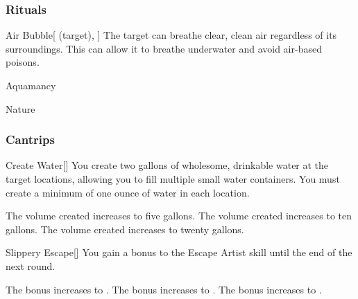 \subsubsection{Rituals}


\lowercase{\hypertarget{spell:Air Bubble}{}}\label{spell:Air Bubble}
\begin{attuneability}[Rank 3]{\hypertarget{spell:Air Bubble}{Air Bubble}}[ (target), ]
The target can breathe clear, clean air regardless of its surroundings.
This can allow it to breathe underwater and avoid air-based poisons.
\end{attuneability}
\vspace{0.25em}


\newpage
\begin{spellsection}{Aquamancy}

\begin{spellheader}
\end{spellheader}


 Nature

\subsubsection{Cantrips}


\begin{freeability}{Create Water}[]
You create two gallons of wholesome, drinkable water at the target locations, allowing you to fill multiple small water containers.
You must create a minimum of one ounce of water in each location.

\rankline
{} The volume created increases to five gallons.
 The volume created increases to ten gallons.
 The volume created increases to twenty gallons.
\end{freeability}


\begin{freeability}{Slippery Escape}[]
You gain a  bonus to the Escape Artist skill until the end of the next round.

\rankline
{} The bonus increases to .
 The bonus increases to .
 The bonus increases to .
\end{freeability}

\end{spellsection}


